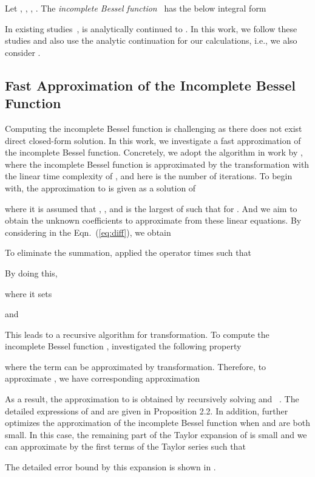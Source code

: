 \documentclass[nohyperref]{article}
\theoremstyle{plain}
\theoremstyle{definition}
\theoremstyle{remark}
\begin{document}
Let , , , . The \textit{incomplete Bessel function}~\citep{bessel} has the below integral form

In existing studies~\citep{bessel, besselcal, jones2007incomplete},
 is analytically continued to . In this work, we follow these studies and also use the analytic continuation for our calculations, i.e., we also consider .


\subsection{Fast Approximation of the Incomplete Bessel Function}
\label{fastbessel}
Computing the incomplete Bessel function is challenging as there does not exist direct closed-form solution. In this work, we investigate a fast approximation of the incomplete Bessel function.
Concretely, we adopt the algorithm in work by \citet{fft, besselcal}, where the incomplete Bessel function  is approximated by the  transformation with the linear time complexity of , and  here is the number of iterations. To begin with, the approximation  to  is given as a solution of  

where it is assumed that , , and  is the largest of  such that  for . And we aim to obtain the unknown coefficients  to approximate  from these  linear equations. By considering  in the Eqn.~(\ref{eq:diff}), we obtain

To eliminate the summation, \citet{besselcal} applied the  operator  times such that

By doing this,

where it sets

and

This leads to a recursive algorithm for  transformation. To compute the incomplete Bessel function , \citet{besselcal} investigated the following property

where the term  can be approximated by  transformation. Therefore, to approximate , we have corresponding approximation 


As a result, the approximation  to  is obtained by recursively solving  and ~\citep{besselcal, gaudreau2012computation}. The detailed expressions of  and  are given in \citet{besselcal} Proposition 2.2. In addition, \citet{fft} further optimizes the approximation of the incomplete Bessel function when  and  are both small. In this case, the remaining part of the Taylor expansion of  is small and we can approximate  by the first 
 terms of the Taylor series such that

The detailed error bound by this expansion is shown in \citet{fft}.
\end{document}
